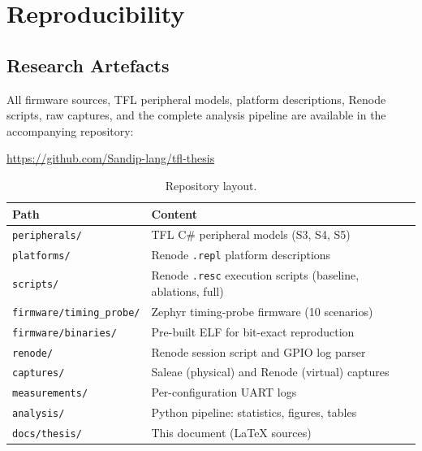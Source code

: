 \chapter{Reproducibility}
\label{app:reproducibility}

\section{Research Artefacts}

All firmware sources, TFL peripheral models, platform descriptions,
Renode scripts, raw captures, and the complete analysis pipeline are
available in the accompanying repository:

\begin{center}
  \url{https://github.com/Sandip-lang/tfl-thesis}
\end{center}

\begin{table}[hb]
  \centering
  \caption[Repository layout]{Repository layout.}
  \label{tab:repo}
  \small
  \begin{tabular}{@{}ll@{}}
    \toprule
    Path & Content \\
    \midrule
    \texttt{peripherals/}        & TFL C\# peripheral models (S3, S4, S5) \\
    \texttt{platforms/}          & Renode \texttt{.repl} platform descriptions \\
    \texttt{scripts/}            & Renode \texttt{.resc} execution scripts (baseline, ablations, full) \\
    \texttt{firmware/timing\_probe/} & Zephyr timing-probe firmware (10 scenarios) \\
    \texttt{firmware/binaries/}  & Pre-built ELF for bit-exact reproduction \\
    \texttt{renode/}             & Renode session script and GPIO log parser \\
    \texttt{captures/}           & Saleae (physical) and Renode (virtual) captures \\
    \texttt{measurements/}       & Per-configuration UART logs \\
    \texttt{analysis/}           & Python pipeline: statistics, figures, tables \\
    \texttt{docs/thesis/}        & This document (\LaTeX{} sources) \\
    \bottomrule
  \end{tabular}
\end{table}

